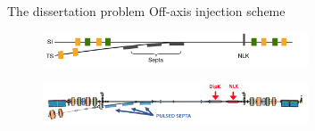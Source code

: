 \documentclass[aspectratio=169]{beamer}
\begin{document}
\begin{frame}{The dissertation problem}
    Off-axis injection scheme
    \begin{figure}
        \centering
        \includegraphics[width=0.7\textwidth]{injection.pdf}
    \end{figure}
    \pause
    \begin{figure}
        \centering
        \includegraphics[width=0.7\textwidth]{off_axis_injection.png}
    \end{figure}
\end{frame}
\end{document}
